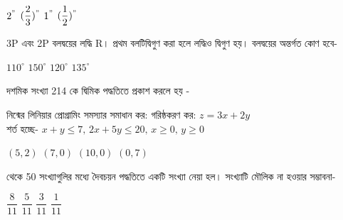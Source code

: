 \documentclass[addpoints]{exam}
\begin{document}
\begin{questions}
\begin{oneparchoices}
\choice $ 2^{"} $
\choice $ (\dfrac{2}{3})^{"} $
\choice $ 1^{"} $
\choice $ (\dfrac{1}{2})^{"} $

\end{oneparchoices}

\question  3P এবং 2P বলদ্বয়ের লদ্ধি R। প্রথম বলটিদ্বিগুণ করা হলে লদ্ধিও দ্বিগুণ হয়। বলদ্বয়ের অন্তর্গত কোণ হবে-

\begin{oneparchoices}
\choice $ 110^{\circ} $
\choice $ 150^{\circ} $
\choice $ 120^{\circ} $
\choice $ 135^{\circ} $

\end{oneparchoices}

\question দশমিক সংখ্যা 214 কে দ্বিমিক পদ্ধতিতে প্রকাশ করলে হয় - 

\begin{oneparchoices}
\end{oneparchoices}

\question নিন্মের লিনিয়ার প্রোগ্রামিং সমস্যার সমাধান কর:
গরিষ্ঠকরণ কর: $ z=3x+2y $\\
শর্ত হচ্ছে-  $ x+y\le 7,\, 2x+5y\le 20,\, x\ge 0,\,y\ge 0 $


\begin{oneparchoices}
\choice $ (5,2) $
\choice $ (7,0) $
\choice $ (10,0) $
\choice $ (0,7) $
\end{oneparchoices}

 থেকে 50 সংখ্যাগুলির মধ্যে দৈবচয়ন পদ্ধতিতে একটি সংখ্যা নেয়া হল। সংখ্যাটি মৌলিক না হওয়ার সম্ভাবনা-

\begin{oneparchoices}
\choice $ \dfrac{8}{11} $
\choice  $ \dfrac{5}{11} $
\choice $ \dfrac{3}{11} $
\choice $ \dfrac{1}{11} $

\end{oneparchoices}

\end{questions}
\end{document}
